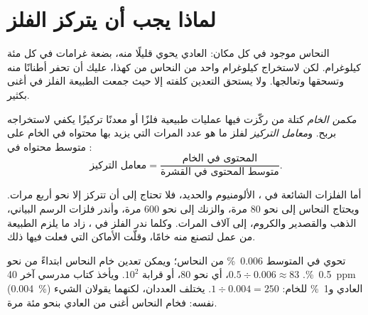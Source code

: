 \section{لماذا يجب أن يتركز الفلز}

النحاس موجود في كل مكان:  العادي يحوي قليلًا منه، بضعة غرامات في
كل مئة كيلوغرام. لكن لاستخراج كيلوغرام واحد من النحاس من  كهذا،
عليك أن تحفر أطنانًا منه وتسحقها وتعالجها. ولا يستحق التعدين كلفته إلا
حيث جمعت الطبيعة الفلز في  أغنى بكثير.

\begin{definition}\label{def:g9:earth-resources:ore-deposit}
\emph{مكمن الخام} كتلة من  ركّزت فيها عمليات
طبيعية فلزًا أو معدنًا تركيزًا يكفي لاستخراجه بربح.
و\emph{معامل التركيز} لفلز ما هو عدد المرات التي
يزيد بها محتواه في الخام على متوسط محتواه في :
\[
\text{معامل التركيز} = \frac{\text{المحتوى في الخام}}{\text{متوسط المحتوى في القشرة}} .
\]
\end{definition}

أما الفلزات الشائعة في ، الألومنيوم والحديد، فلا تحتاج إلى أن
تتركز إلا نحو أربع مرات. ويحتاج النحاس إلى نحو 80 مرة، والزنك إلى نحو
600 مرة، وأندر فلزات الرسم البياني، الذهب والقصدير والكروم، إلى آلاف
المرات. وكلما ندر الفلز في ، زاد ما يلزم الطبيعة من عمل لتصنع
منه خامًا، وقلّت الأماكن التي فعلت فيها ذلك.

\begin{example}[النحاس]
تحوي  في المتوسط \qty{0.006}{\%} من النحاس؛ ويمكن تعدين خام
النحاس ابتداءً من نحو \qty{0.5}{\%}.  $0.5 \div 0.006
\approx 83$، أي نحو 80، أو قرابة $10^2$. ويأخذ كتاب مدرسي آخر \qty{40}{ppm}
(\qty{0.004}{\%})  العادي و\qty{1}{\%} للخام: $1 \div
0.004 = 250$. يختلف العددان، لكنهما يقولان الشيء نفسه: فخام النحاس
أغنى من  العادي بنحو مئة مرة.
\end{example}

